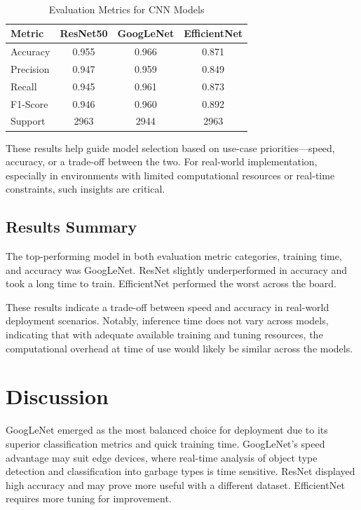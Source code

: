 \documentclass[11pt,twocolumn]{article}
\begin{document}
\begin{table}[h]
\centering
\caption{Evaluation Metrics for CNN Models}
\
\renewcommand{\arraystretch}{1} %
\begin{tabular}{|l|c|c|c|}

\hline
\textbf{\scriptsize Metric} & \textbf{\scriptsize ResNet50} & \textbf{\scriptsize GoogLeNet} & \textbf{\scriptsize EfficientNet} \\
\hline
Accuracy        & 0.955 & 0.966 & 0.871 \\
Precision       & 0.947 & 0.959 & 0.849 \\
Recall          & 0.945 & 0.961 & 0.873 \\
F1-Score        & 0.946 & 0.960 & 0.892 \\
Support         & 2963  & 2944  & 2963 \\
\hline
\end{tabular}
\label{tab:evaluation-smallheader}
\end{table}

These results help guide model selection based on use-case priorities—speed, accuracy, or a trade-off between the two. For real-world implementation, especially in environments with limited computational resources or real-time constraints, such insights are critical.

\subsection{Results Summary}

The top-performing model in both evaluation metric categories, training time, and accuracy was GoogLeNet. ResNet slightly underperformed in accuracy and took a long time to train. EfficientNet performed the worst across the board.  

These results indicate a trade-off between speed and accuracy in real-world deployment scenarios. Notably, inference time does not vary across models, indicating that with adequate available training and tuning resources, the computational overhead at time of use would likely be similar across the models.

\section{Discussion}
\label{sec:discussion}
GoogLeNet emerged as the most balanced choice for deployment due to its superior classification metrics and quick training time. GoogLeNet's speed advantage may suit edge devices, where real-time analysis of object type detection and classification into garbage types is time sensitive. ResNet displayed high accuracy and may prove more useful with a different dataset. EfficientNet requires more tuning for improvement. 
\vspace{0.2cm}
\end{document}
